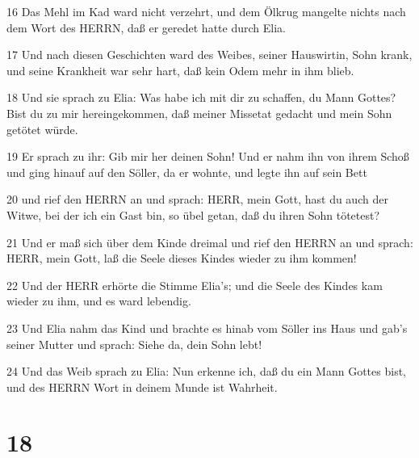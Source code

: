 \par 16 Das Mehl im Kad ward nicht verzehrt, und dem Ölkrug mangelte nichts nach dem Wort des HERRN, daß er geredet hatte durch Elia.
\par 17 Und nach diesen Geschichten ward des Weibes, seiner Hauswirtin, Sohn krank, und seine Krankheit war sehr hart, daß kein Odem mehr in ihm blieb.
\par 18 Und sie sprach zu Elia: Was habe ich mit dir zu schaffen, du Mann Gottes? Bist du zu mir hereingekommen, daß meiner Missetat gedacht und mein Sohn getötet würde.
\par 19 Er sprach zu ihr: Gib mir her deinen Sohn! Und er nahm ihn von ihrem Schoß und ging hinauf auf den Söller, da er wohnte, und legte ihn auf sein Bett
\par 20 und rief den HERRN an und sprach: HERR, mein Gott, hast du auch der Witwe, bei der ich ein Gast bin, so übel getan, daß du ihren Sohn tötetest?
\par 21 Und er maß sich über dem Kinde dreimal und rief den HERRN an und sprach: HERR, mein Gott, laß die Seele dieses Kindes wieder zu ihm kommen!
\par 22 Und der HERR erhörte die Stimme Elia's; und die Seele des Kindes kam wieder zu ihm, und es ward lebendig.
\par 23 Und Elia nahm das Kind und brachte es hinab vom Söller ins Haus und gab's seiner Mutter und sprach: Siehe da, dein Sohn lebt!
\par 24 Und das Weib sprach zu Elia: Nun erkenne ich, daß du ein Mann Gottes bist, und des HERRN Wort in deinem Munde ist Wahrheit.

\chapter{18}

